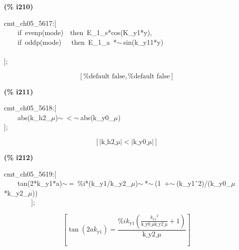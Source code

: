 \documentclass[fleqn]{article}
\begin{document}
\noindent
\begin{minipage}[t]{4.000000em}\color{red}\bfseries
(\% i210)	
\end{minipage}
\begin{minipage}[t]{\textwidth}\color{blue}
cmt\_ch05\_5617:[\\
\ \ \ \ if\ evenp(mode)\ \ then\ E\_1\_s*cos(K\_y1*y),\\
\ \ \ \ if\ oddp(mode)\ \ \ then\ E\_1\_a\ *\ensuremath{\sim\ }sin(k\_y11*y)\\
\\
];
\end{minipage}
\[\displaystyle \tag{\% o210} 
\left[ \mbox{%
false}\operatorname{,}\mbox{%
false}\right] \mbox{}
\]


\noindent
\begin{minipage}[t]{4.000000em}\color{red}\bfseries
(\% i211)	
\end{minipage}
\begin{minipage}[t]{\textwidth}\color{blue}
cmt\_ch05\_5618:[\\
\ \ \ \ abs(k\_h2\_\ensuremath{\mu})\ensuremath{\sim\ }\ensuremath{<}\ensuremath{\sim\ }abs(k\_y0\_\ensuremath{\mu})\\
];
\end{minipage}
\[\displaystyle \tag{\% o211} 
\left[ \left| \ensuremath{\mathrm{k\_ h2\_ \mu }}\right| \operatorname{<  }\left| \ensuremath{\mathrm{k\_ y0\_ \mu }}\right| \right] \mbox{}
\]


\noindent
\begin{minipage}[t]{4.000000em}\color{red}\bfseries
(\% i212)	
\end{minipage}
\begin{minipage}[t]{\textwidth}\color{blue}
cmt\_ch05\_5619:[\\
\ \ \ \ tan(2*k\_y1*a)\ensuremath{\sim\ }=\ \%i*(k\_y1/k\_y2\_\ensuremath{\mu})\ensuremath{\sim\ }*\ensuremath{\sim\ }(1\ +\ensuremath{\sim\ }(k\_y1\^\ 2)/(k\_y0\_\ensuremath{\mu}*k\_y2\_\ensuremath{\mu}))\\
\ \ \ \ \ \ \ \ ];
\end{minipage}
\[\displaystyle \tag{\% o212} 
\left[ \tan{\left( 2 a {k_{\ensuremath{\mathrm{y1}}}}\right) }=\frac{\% i {k_{\ensuremath{\mathrm{y1}}}} \left( \frac{{{{k_{\ensuremath{\mathrm{y1}}}}}^{2}}}{\ensuremath{\mathrm{k\_ y0\_ \mu }} \ensuremath{\mathrm{k\_ y2\_ \mu }}}+1\right) }{\ensuremath{\mathrm{k\_ y2\_ \mu }}}\right] \mbox{}
\]
\end{document}
